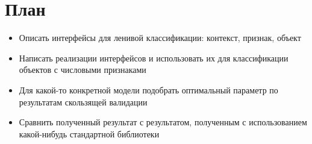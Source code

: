 \documentclass{article}
\begin{document}
\section{План}
    \begin{itemize}
        \item Описать интерфейсы для ленивой классификации: контекст, признак, объект
        \item Написать реализации интерфейсов и использовать их для классификации объектов с числовыми признаками
        \item Для какой-то конкретной модели подобрать оптимальный параметр по результатам скользящей валидации
        \item Сравнить полученный результат с результатом, полученным с использованием какой-нибудь стандартной библиотеки
    \end{itemize}
\end{document}
